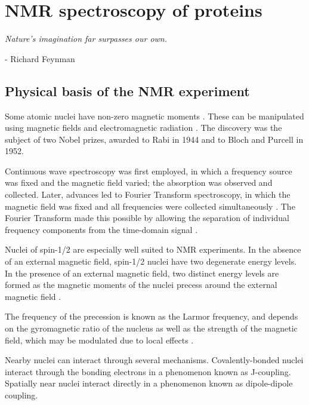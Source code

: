 \chapter{NMR spectroscopy of proteins}
\begin{center}
  \textit{Nature's imagination far surpasses our own.}

 - Richard Feynman
\end{center}


\section{Physical basis of the NMR experiment}

Some atomic nuclei have non-zero magnetic moments \cite{zeeman1897effect}. 
These can be manipulated using magnetic fields and electromagnetic radiation 
\cite{bloch1946nuclear, rabi1938}.  The discovery was the subject of two 
Nobel prizes, awarded to Rabi in 1944 and to Bloch and Purcell in 1952.

Continuous wave spectroscopy was first employed, in which a frequency source 
was fixed and the magnetic field varied; the absorption was observed and 
collected.  Later, advances led to Fourier Transform spectroscopy, in which
the magnetic field was fixed and all frequencies were collected simultaneously
\cite{aue1976two}.  The Fourier Transform made this possible by allowing the
separation of individual frequency components from the time-domain signal
\cite{ernst2004}.

Nuclei of spin-1/2 are especially well suited to NMR experiments.  In the 
absence of an external magnetic field, spin-1/2 nuclei have two degenerate 
energy levels.  In the presence of an external magnetic field, two distinct 
energy levels are formed as the magnetic moments of the nuclei precess 
around the external magnetic field \cite{hahn1950spin, bloembergen1948relaxation}.

The frequency of the precession is known as the Larmor frequency, and depends 
on the gyromagnetic ratio of the nucleus as well as the strength of the 
magnetic field, which may be modulated due to local effects
\cite{carr1954effects, meiboom1958modified}.

Nearby nuclei can interact through several mechanisms.  Covalently-bonded nuclei
interact through the bonding electrons in a phenomenon known as J-coupling.
Spatially near nuclei interact directly in a phenomenon known as dipole-dipole
coupling.


